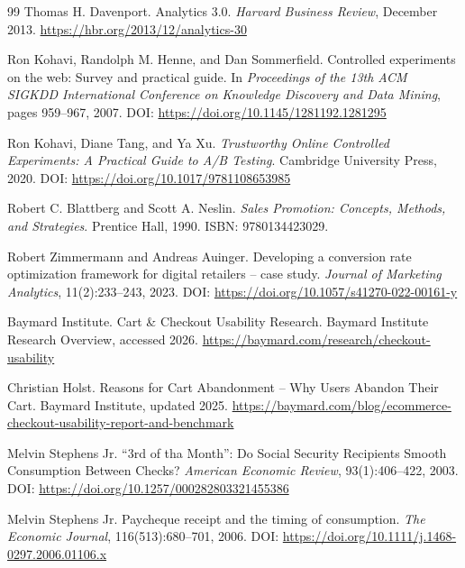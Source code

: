 \documentclass{article}
\begin{document}
{}
\renewcommand{\refname}{Tài liệu tham khảo}
\begin{thebibliography}{99}
Thomas H. Davenport.
\newblock Analytics 3.0.
\newblock \emph{Harvard Business Review}, December 2013.
\newblock \url{https://hbr.org/2013/12/analytics-30}

Ron Kohavi, Randolph M. Henne, and Dan Sommerfield.
\newblock Controlled experiments on the web: Survey and practical guide.
\newblock In \emph{Proceedings of the 13th ACM SIGKDD International Conference on Knowledge Discovery and Data Mining}, pages 959--967, 2007.
\newblock DOI: \url{https://doi.org/10.1145/1281192.1281295}

Ron Kohavi, Diane Tang, and Ya Xu.
\newblock \emph{Trustworthy Online Controlled Experiments: A Practical Guide to A/B Testing}.
\newblock Cambridge University Press, 2020.
\newblock DOI: \url{https://doi.org/10.1017/9781108653985}

Robert C. Blattberg and Scott A. Neslin.
\newblock \emph{Sales Promotion: Concepts, Methods, and Strategies}.
\newblock Prentice Hall, 1990.
\newblock ISBN: 9780134423029.

Robert Zimmermann and Andreas Auinger.
\newblock Developing a conversion rate optimization framework for digital retailers -- case study.
\newblock \emph{Journal of Marketing Analytics}, 11(2):233--243, 2023.
\newblock DOI: \url{https://doi.org/10.1057/s41270-022-00161-y}

Baymard Institute.
\newblock Cart \& Checkout Usability Research.
\newblock Baymard Institute Research Overview, accessed 2026.
\newblock \url{https://baymard.com/research/checkout-usability}

Christian Holst.
\newblock Reasons for Cart Abandonment -- Why Users Abandon Their Cart.
\newblock Baymard Institute, updated 2025.
\newblock \url{https://baymard.com/blog/ecommerce-checkout-usability-report-and-benchmark}

Melvin Stephens Jr.
\newblock ``3rd of tha Month'': Do Social Security Recipients Smooth Consumption Between Checks?
\newblock \emph{American Economic Review}, 93(1):406--422, 2003.
\newblock DOI: \url{https://doi.org/10.1257/000282803321455386}

Melvin Stephens Jr.
\newblock Paycheque receipt and the timing of consumption.
\newblock \emph{The Economic Journal}, 116(513):680--701, 2006.
\newblock DOI: \url{https://doi.org/10.1111/j.1468-0297.2006.01106.x}
\end{thebibliography}
\end{document}
